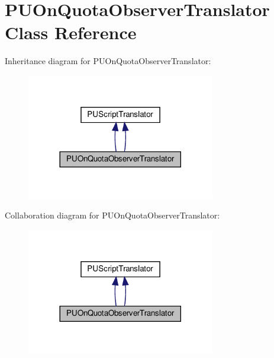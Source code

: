 \hypertarget{classPUOnQuotaObserverTranslator}{}\section{P\+U\+On\+Quota\+Observer\+Translator Class Reference}
\label{classPUOnQuotaObserverTranslator}


Inheritance diagram for P\+U\+On\+Quota\+Observer\+Translator\+:
\nopagebreak
\begin{figure}[H]
\begin{center}
\leavevmode
\includegraphics[width=233pt]{classPUOnQuotaObserverTranslator__inherit__graph}
\end{center}
\end{figure}


Collaboration diagram for P\+U\+On\+Quota\+Observer\+Translator\+:
\nopagebreak
\begin{figure}[H]
\begin{center}
\leavevmode
\includegraphics[width=233pt]{classPUOnQuotaObserverTranslator__coll__graph}
\end{center}
\end{figure}
